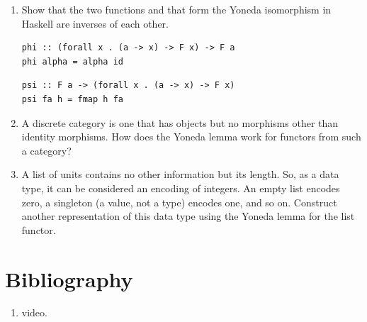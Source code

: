 \begin{enumerate}
\tightlist
\item
  Show that the two functions  and  that form
  the Yoneda isomorphism in Haskell are inverses of each other.

\begin{Verbatim}
phi :: (forall x . (a -> x) -> F x) -> F a
phi alpha = alpha id
\end{Verbatim}
\begin{Verbatim}
psi :: F a -> (forall x . (a -> x) -> F x)
psi fa h = fmap h fa
\end{Verbatim}
\item
  A discrete category is one that has objects but no morphisms other
  than identity morphisms. How does the Yoneda lemma work for functors
  from such a category?
\item
  A list of units \code{{[}(){]}} contains no other information but
  its length. So, as a data type, it can be considered an encoding of
  integers. An empty list encodes zero, a singleton \code{{[}(){]}} (a
  value, not a type) encodes one, and so on. Construct another
  representation of this data type using the Yoneda lemma for the list
  functor.
\end{enumerate}

\section{Bibliography}

\begin{enumerate}
\tightlist
\item
   video.
\end{enumerate}
